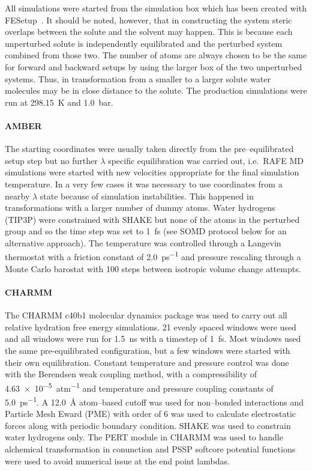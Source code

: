 \documentclass[journal=jctcce,manuscript=article]{achemso}
\begin{document}
All simulations were started from the simulation box which has been 
created with FESetup~\cite{loeffler_fesetup:_2015}.  It should be noted, 
however, that in constructing the system steric overlaps between the solute and 
the solvent may happen.  This is because each unperturbed solute is 
independently equilibrated and the perturbed system combined from those two.  
The number of atoms are always chosen to be the same for forward and backward 
setups by using the larger box of the two unperturbed systems.  Thus, in 
transformation from a smaller to a larger solute water molecules may be in 
close distance to the solute.  The production simulations were run at 
\SI{298.15}{K} and \SI{1.0}{bar}.

\paragraph{AMBER} The starting coordinates were usually taken directly from the
pre--equilibrated setup step but no further $\lambda$ specific equilibration 
was carried out, i.e.\ RAFE MD simulations were started with new velocities appropriate for the 
final simulation temperature.  In a very few cases it was necessary to use 
coordinates from a nearby $\lambda$ state because of simulation instabilities.  
This happened in transformations with a larger number of dummy atoms.  Water 
hydrogens (TIP3P) were constrained with SHAKE but none of the atoms in the 
perturbed group and so the time step was set to \SI{1}{fs} (see SOMD protocol 
below for an alternative approach).  The temperature was controlled through a 
Langevin thermostat with a friction constant of \SI{2.0}{ps^{-1}} and pressure 
rescaling through a Monte Carlo barostat with 100 steps between isotropic 
volume change attempts.

\paragraph{CHARMM} The CHARMM c40b1 molecular dynamics package was used to 
carry out all relative hydration free energy simulations.  21 evenly spaced 
windows were used and all windows were run for \SI{1.5}{ns} with a timestep of 
\SI{1}{fs}.  Most windows used the same pre-equilibrated configuration, but a 
few windows were started with their own equilibration.  Constant temperature 
and pressure control was done with the Berendsen weak coupling method, with a 
compressibility of \SI{4.63e-5}{atm^{-1}} and temperature and pressure coupling 
constants of \SI{5.0}{ps^{-1}}.  A \SI{12.0}{\angstrom} atom--based cutoff was 
used for non--bonded interactions and Particle Mesh Eward (PME) with order of 6 
was used to calculate electrostatic forces along with periodic boundary 
condition.  SHAKE was used to constrain water hydrogens only.  The PERT module 
in CHARMM was used to handle alchemical transformation in conunction and PSSP 
softcore potential functions were used to avoid numerical issue at the end 
point lambdas.
\end{document}
